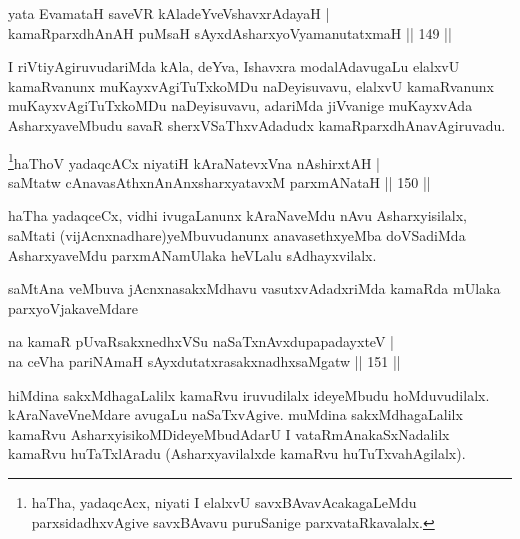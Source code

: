 
\begin{shl}
yata EvamataH saveVR kAladeYveVshavxrAdayaH |\\
kamaRparxdhAnAH puMsaH sAyxdAsharxyoV\s yamanutatxmaH \hfill || 149 ||
\end{shl}

\begin{artha}
I riVtiyAgiruvudariMda kAla, deYva, Ishavxra modalAdavugaLu elalxvU kamaRvanunx muKayxvAgiTuTxkoMDu naDeyisuvavu, elalxvU kamaRvanunx muKayxvAgiTuTxkoMDu naDeyisuvavu, adariMda jiVvanige muKayxvAda AsharxyaveMbudu savaR sherxVSaThxvAdadudx kamaRparxdhAnavAgiruvadu.
\end{artha}

\begin{shl}
\footnote{haTha, yadaqcAcx, niyati I elalxvU savxBAvavAcakagaLeMdu parxsidadhxvAgive savxBAvavu puruSanige parxvataRkavalalx.}haThoV yadaqcACx niyatiH kAraNatevxVna nA\s \s shirxtAH |\\
saMtatw cAnavasAthxnAnAnx\s \s sharxyatavxM parxmANataH \hfill || 150 ||
\end{shl}

\begin{artha}
haTha yadaqceCx, vidhi ivugaLanunx kAraNaveMdu nAvu Asharxyisilalx, saMtati (vijAcnxnadhare)yeMbuvudanunx anavasethxyeMba doVSadiMda AsharxyaveMdu parxmANamUlaka heVLalu sAdhayxvilalx.
\end{artha}


\begin{artha}
saMtAna veMbuva jAcnxnasakxMdhavu vasutxvAdadxriMda kamaRda mUlaka parxyoVjakaveMdare
\end{artha}

\begin{shl}
na kamaR pUvaRsakxnedhxVSu naSaTxnAvxdupapadayxteV |\\
na ceVha pariNAmaH sAyxdutatxrasakxnadhxsaMgatw \hfill || 151 ||
\end{shl}

\begin{artha}
hiMdina sakxMdhagaLalilx kamaRvu iruvudilalx ideyeMbudu hoMduvudilalx. kAraNaveVneMdare avugaLu naSaTxvAgive. muMdina sakxMdhagaLalilx kamaRvu AsharxyisikoMDideyeMbudAdarU I vataRmAnakaSxNadalilx kamaRvu huTaTxlAradu (Asharxyavilalxde kamaRvu huTuTxvahAgilalx).
\end{artha}

